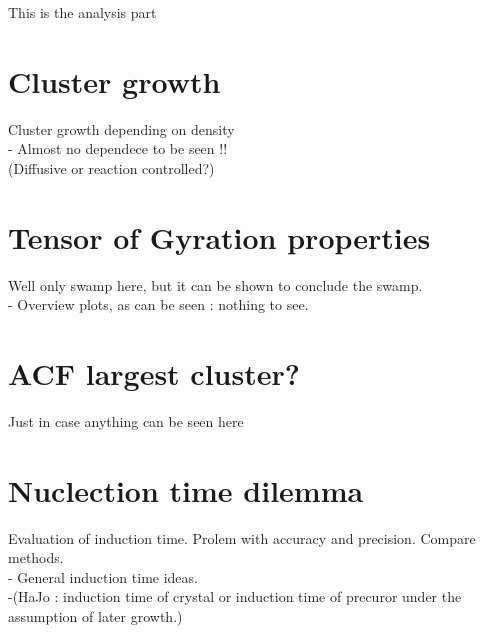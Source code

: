 
\label{chp:data_analysis}
This is the analysis part



\section{Cluster growth}
\label{sec:Cluster growth}
Cluster growth depending on density\\
- Almost no dependece to be seen !! \\
(Diffusive or reaction controlled?) \\

\section{Tensor of Gyration properties}
\label{sec:tog}
Well only swamp here, but it can be shown to conclude the swamp.\\
- Overview plots, as can be seen : nothing to see.\\


\section{ACF largest cluster?}
\label{sec:acf}
Just in case anything can be seen here

\section{Nuclection time dilemma}
\label{sec:nucleation_times}
Evaluation of induction time. Prolem with accuracy and precision. Compare methods.\\

- General induction time ideas.\\
-(HaJo : induction time of crystal or induction time of precuror under the assumption of later growth.)

